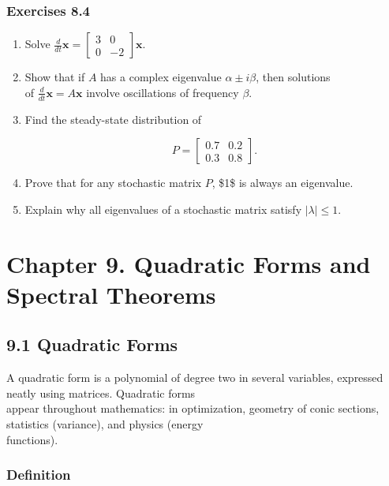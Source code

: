 \documentclass[
  12pt,
  a4paper,
]{article}
\let\oldsection\section
\renewcommand{\section}{\clearpage\oldsection}
\begin{document}
\subsubsection{Exercises 8.4}\label{exercises-84}

\begin{enumerate}
\def\labelenumi{\arabic{enumi}.}
\item
  Solve
  \(\tfrac{d}{dt}\mathbf{x} = \begin{bmatrix} 3 & 0 \\ 0 & -2 \end{bmatrix}\mathbf{x}\).
\item
  Show that if \(A\) has a complex eigenvalue \(\alpha \pm i\beta\),
  then solutions\\
  of \(\tfrac{d}{dt}\mathbf{x} = A\mathbf{x}\) involve oscillations of
  frequency \(\beta\).
\item
  Find the steady-state distribution of

  \[P = \begin{bmatrix} 0.7 & 0.2 \\ 0.3 & 0.8 \end{bmatrix}.\]
\item
  Prove that for any stochastic matrix \(P\), \$1\$ is always an
  eigenvalue.
\item
  Explain why all eigenvalues of a stochastic matrix satisfy
  \(|\lambda| \leq 1\).
\end{enumerate}

\section{Chapter 9. Quadratic Forms and Spectral
Theorems}\label{chapter-9-quadratic-forms-and-spectral-theorems}

\subsection{9.1 Quadratic Forms}\label{91-quadratic-forms}

A quadratic form is a polynomial of degree two in several variables,
expressed neatly using matrices. Quadratic forms\\
appear throughout mathematics: in optimization, geometry of conic
sections, statistics (variance), and physics (energy\\
functions).

\subsubsection{Definition}\label{definition-8}
\end{document}
